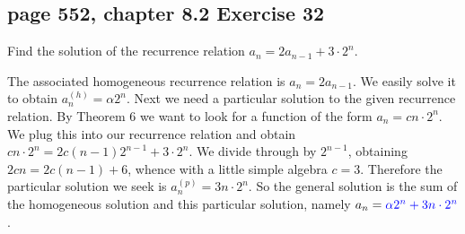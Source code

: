 \documentclass[sigconf]{acmart}
\newcommand{\answer}[2]{%
  \if\relax\detokenize{#2}\relax
    \underline{\mbox{請作答}}%
  \else
    \textcolor{blue}{#2}%
  \fi
}
\begin{document}
\subsection{page 552, chapter 8.2 Exercise 32}
\begin{shaded}
    Find the solution of the recurrence relation $a_n = 2a_{n-1} + 3 \cdot 2^n$.
\end{shaded}
The associated homogeneous recurrence relation is $a_n = 2a_{n-1}$. We easily solve it to obtain $a_n^{(h)} = \alpha2^n$. Next
we need a particular solution to the given recurrence relation. By Theorem 6 we want to look for a function of the form $a_n = cn \cdot 2^n$. We plug this into our recurrence relation and obtain $cn \cdot 2^n = 2c(n - 1)2^{n-1} + 3 \cdot 2^n$. We divide through by $2^{n-1}$, obtaining $2cn = 2c(n - 1) + 6$, whence with a little simple algebra $c = 3$. Therefore the particular solution we seek is $a_n^{(p)} = 3n\cdot2^n$. So the general solution is the sum of the homogeneous solution and this particular solution, namely $a_n = \answer{8.2.32a}{\alpha2^n + 3n\cdot2^n}$.
\end{document}
